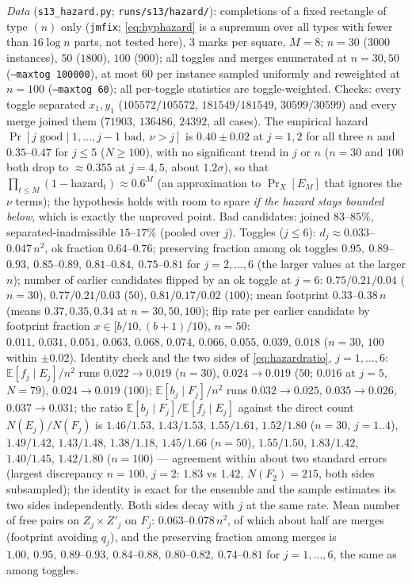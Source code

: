 \emph{Data} (\texttt{s13\_hazard.py}; \texttt{runs/s13/hazard/}):
completions of a fixed rectangle of type $(n)$ only (\texttt{jmfix};
\eqref{eq:hyphazard} is a supremum over all types with fewer than
$16\log n$ parts, not tested here), $3$ marks per square, $M=8$; $n=30$ ($3000$ instances), $50$ ($1800$),
$100$ ($900$); all toggles and merges enumerated at $n=30,50$
(\texttt{--maxtog 100000}), at most $60$ per instance sampled
uniformly and reweighted at $n=100$ (\texttt{--maxtog 60}); all
per-toggle statistics are toggle-weighted.  Checks: every toggle
separated $x_1,y_1$ ($105572/105572$, $181549/181549$,
$30599/30599$) and every merge joined them ($71903$, $136486$,
$24392$, all cases).  The empirical hazard $\Pr[j\text{ good}\mid
1,\dots,j-1\text{ bad},\ \nu>j]$ is $0.40\pm0.02$ at $j=1,2$ for all
three $n$ and $0.35$--$0.47$ for $j\le5$ ($N\ge100$), with no
significant trend in $j$ or $n$ ($n=30$ and $100$ both drop to
$\approx0.355$ at $j=4,5$, about $1.2\sigma$), so that $\prod_{t\le M}(1-\text{hazard}_t)\approx0.6^M$
(an approximation to $\Pr_X[E_M]$ that ignores the $\nu$ terms); the
hypothesis holds with room to spare \emph{if the hazard stays bounded
below}, which is exactly the unproved point.  Bad candidates: joined
$83$--$85\%$, separated-inadmissible $15$--$17\%$ (pooled over $j$).
Toggles ($j\le6$): $d_j\approx0.033$--$0.047\,n^2$, ok fraction
$0.64$--$0.76$; preserving fraction among ok toggles
$0.95,\ 0.89$--$0.93,\ 0.85$--$0.89,\ 0.81$--$0.84,\ 0.75$--$0.81$ for
$j=2,\dots,6$ (the larger values at the larger $n$); number of earlier
candidates flipped by an ok toggle at $j=6$: $0.75/0.21/0.04$
($n=30$), $0.77/0.21/0.03$ ($50$), $0.81/0.17/0.02$ ($100$); mean
footprint $0.33$--$0.38\,n$ (means $0.37,0.35,0.34$ at $n=30,50,100$);
flip rate per earlier candidate by footprint fraction
$x\in[b/10,(b+1)/10)$, $n=50$:
$0.011,\,0.031,\,0.051,\,0.063,\,0.068,\,0.074,\,0.066,\,0.055,\,0.039,\,0.018$
($n=30$, $100$ within $\pm0.02$).  Identity check and the two sides of
\eqref{eq:hazardratio}, $j=1,\dots,6$: $\mathbb E[f_j\mid E_j]/n^2$
runs $0.022\to0.019$ ($n=30$), $0.024\to0.019$ ($50$; $0.016$ at
$j=5$, $N=79$), $0.024\to0.019$ ($100$); $\mathbb E[b_j\mid F_j]/n^2$ runs
$0.032\to0.025$, $0.035\to0.026$, $0.037\to0.031$; the ratio
$\mathbb E[b_j\mid F_j]/\mathbb E[f_j\mid E_j]$ against the direct
count $N(E_j)/N(F_j)$ is $1.46/1.53$, $1.43/1.53$, $1.55/1.61$,
$1.52/1.80$ ($n=30$, $j=1..4$), $1.49/1.42$, $1.43/1.48$,
$1.38/1.18$, $1.45/1.66$ ($n=50$), $1.55/1.50$, $1.83/1.42$,
$1.40/1.45$, $1.42/1.80$ ($n=100$) --- agreement within about two
standard errors (largest discrepancy $n=100$, $j=2$: $1.83$ vs
$1.42$, $N(F_2)=215$, both sides subsampled); the identity is exact
for the ensemble and the sample estimates its two sides independently.
Both sides decay with $j$ at the same rate.  Mean number of free pairs
on $Z_j\times Z'_j$ on $F_j$: $0.063$--$0.078\,n^2$, of which about
half are merges (footprint avoiding $q_j$), and the preserving fraction
among merges is $1.00,\ 0.95,\ 0.89$--$0.93,\ 0.84$--$0.88,\
0.80$--$0.82,\ 0.74$--$0.81$ for $j=1,\dots,6$, the same as among
toggles.

